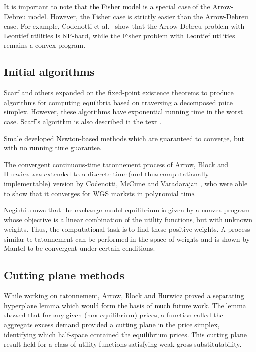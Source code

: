 \documentclass[12pt]{article}
\begin{document}
It is important to note that the Fisher model is a special case of the
Arrow-Debreu model. However, the Fisher case is strictly easier
than the
Arrow-Debreu case. For example, Codenotti et al.\ \cite{codenotti2006leontief}
show that the Arrow-Debreu problem with Leontief utilities is NP-hard, while
the Fisher problem with Leontief utilities remains a convex program.

\subsection{Initial algorithms}

Scarf and others \cite{scarf2008applied,eaves1972homotopies,kuhn1968simplicial}
expanded on the fixed-point existence theorems to produce algorithms for
computing equilibria based on traversing a decomposed price simplex.
However, these algorithms have exponential running time in the worst case.
Scarf's algorithm is also described in the text \cite{shoven1992applying}.

Smale \cite{smale1976convergent, smale1976exchange} developed Newton-based
methods which are guaranteed to converge, but with no running time guarantee.

The convergent continuous-time tatonnement process of Arrow, Block and Hurwicz
\cite{arrow1959stability} was extended to a discrete-time
(and thus computationally implementable) version by Codenotti, McCune and
Varadarajan \cite{codenotti2005marketExcess}, who were able to show that it
converges for WGS markets in polynomial time.

Negishi \cite{negishi1960welfare} shows that the exchange model equilibrium is
given by a convex program whose objective is a linear combination of the
utility functions, but with unknown weights.
Thus, the computational task is to find these positive weights.
A process similar to tatonnement can be performed in the space of weights
and is shown by Mantel \cite{mantel1971welfare} to be convergent under certain
conditions.

\subsection{Cutting plane methods}
While working on tatonnement, Arrow, Block and Hurwicz \cite{arrow1959stability}
proved a separating hyperplane lemma which would form the basis of much future
work.
The lemma showed that for any given (non-equilibrium) prices, a function called
the aggregate excess demand provided a cutting plane in the price simplex,
identifying which half-space contained the equilibrium prices.
This cutting plane result held for a class of utility functions satisfying
weak gross substitutability.
\end{document}
